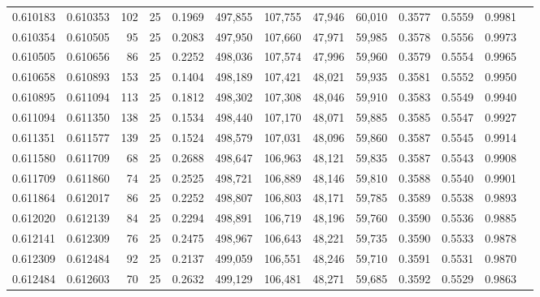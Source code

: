\begin{tabular}{rrrrrrrrrrrrr}
0.610183 & 0.610353 &   102 &  25 &                                     0.1969 & 497,855 & 107,755 &  47,946 &  60,010 & 0.3577 & 0.5559 & 0.9981 \\
0.610354 & 0.610505 &    95 &  25 &                                     0.2083 & 497,950 & 107,660 &  47,971 &  59,985 & 0.3578 & 0.5556 & 0.9973 \\
0.610505 & 0.610656 &    86 &  25 &                                     0.2252 & 498,036 & 107,574 &  47,996 &  59,960 & 0.3579 & 0.5554 & 0.9965 \\
0.610658 & 0.610893 &   153 &  25 &                                     0.1404 & 498,189 & 107,421 &  48,021 &  59,935 & 0.3581 & 0.5552 & 0.9950 \\
0.610895 & 0.611094 &   113 &  25 &                                     0.1812 & 498,302 & 107,308 &  48,046 &  59,910 & 0.3583 & 0.5549 & 0.9940 \\
0.611094 & 0.611350 &   138 &  25 &                                     0.1534 & 498,440 & 107,170 &  48,071 &  59,885 & 0.3585 & 0.5547 & 0.9927 \\
0.611351 & 0.611577 &   139 &  25 &                                     0.1524 & 498,579 & 107,031 &  48,096 &  59,860 & 0.3587 & 0.5545 & 0.9914 \\
0.611580 & 0.611709 &    68 &  25 &                                     0.2688 & 498,647 & 106,963 &  48,121 &  59,835 & 0.3587 & 0.5543 & 0.9908 \\
0.611709 & 0.611860 &    74 &  25 &                                     0.2525 & 498,721 & 106,889 &  48,146 &  59,810 & 0.3588 & 0.5540 & 0.9901 \\
0.611864 & 0.612017 &    86 &  25 &                                     0.2252 & 498,807 & 106,803 &  48,171 &  59,785 & 0.3589 & 0.5538 & 0.9893 \\
0.612020 & 0.612139 &    84 &  25 &                                     0.2294 & 498,891 & 106,719 &  48,196 &  59,760 & 0.3590 & 0.5536 & 0.9885 \\
0.612141 & 0.612309 &    76 &  25 &                                     0.2475 & 498,967 & 106,643 &  48,221 &  59,735 & 0.3590 & 0.5533 & 0.9878 \\
0.612309 & 0.612484 &    92 &  25 &                                     0.2137 & 499,059 & 106,551 &  48,246 &  59,710 & 0.3591 & 0.5531 & 0.9870 \\
0.612484 & 0.612603 &    70 &  25 &                                     0.2632 & 499,129 & 106,481 &  48,271 &  59,685 & 0.3592 & 0.5529 & 0.9863 \\

\end{tabular}
